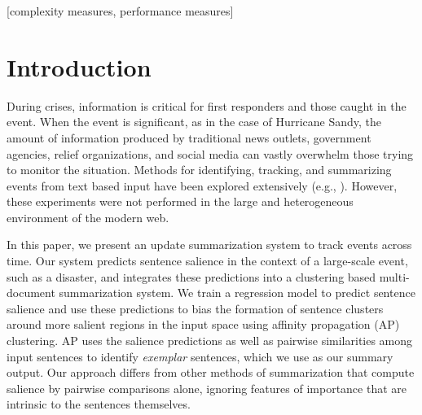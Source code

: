 \documentclass{sig-alternate} \usepackage{url} \usepackage{color}
\begin{document}
[complexity measures,
performance measures]



\section{Introduction}

During crises, information is critical for first responders and those caught
in the event.  When the event is significant, as in the case of Hurricane
Sandy, the amount of information produced by traditional news outlets,
government agencies, relief organizations, and social media can vastly
overwhelm those trying to monitor the situation. Methods for identifying,
tracking, and summarizing events from text based input have been explored
extensively  (e.g.,
\cite{allan1998topic,Filatova&Hatzivassiloglou.04a,Wang&al.11}). However,
these experiments were not performed in the large and heterogeneous
environment of the modern web.




In this paper, we present an update summarization system to track events
across time. Our system predicts sentence salience in the context of a
large-scale event, such as a disaster,  and integrates these predictions into
a clustering based multi-document summarization system. We train a regression
model to predict sentence salience and use these predictions to bias the
formation of sentence clusters around more salient regions in the input space
using affinity propagation (AP) clustering.  AP uses the salience predictions
as well as pairwise similarities among input sentences to identify
\emph{exemplar} sentences, which we use as our summary output.  Our approach
differs from other methods of summarization that compute salience by pairwise
comparisons alone, ignoring features of importance that are intrinsic to the
sentences themselves.
\end{document}
